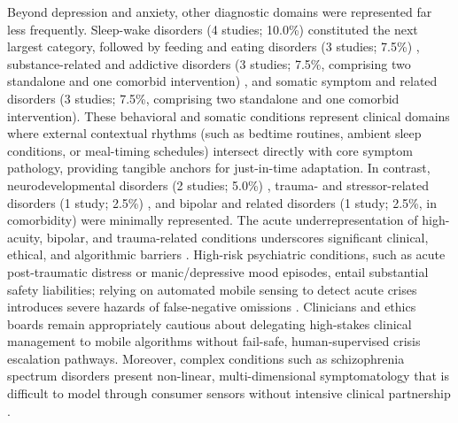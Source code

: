 Beyond depression and anxiety, other diagnostic domains were represented far less frequently. Sleep-wake disorders (4 studies; 10.0\%) \cite{werner-seidler2017sleepninja, pulantara2018insomnia, pulantara2018irest, philip2020kanopee} constituted the next largest category, followed by feeding and eating disorders (3 studies; 7.5\%) \cite{young2021myfoodmood, kasson2024teensengagement, sanchezroman2025eatingdisorders}, substance-related and addictive disorders (3 studies; 7.5\%, comprising two standalone and one comorbid intervention) \cite{adams2021mhealthapp, heinz2024opioidusedisorder}, and somatic symptom and related disorders (3 studies; 7.5\%, comprising two standalone and one comorbid intervention). These behavioral and somatic conditions represent clinical domains where external contextual rhythms (such as bedtime routines, ambient sleep conditions, or meal-timing schedules) intersect directly with core symptom pathology, providing tangible anchors for just-in-time adaptation. In contrast, neurodevelopmental disorders (2 studies; 5.0\%) \cite{yang2023appcbt, spaargaren2025sam}, trauma- and stressor-related disorders (1 study; 2.5\%) \cite{davis2024renewptsd}, and bipolar and related disorders (1 study; 2.5\%, in comorbidity) were minimally represented. The acute underrepresentation of high-acuity, bipolar, and trauma-related conditions underscores significant clinical, ethical, and algorithmic barriers \cite{martinezmartin2021ethical}. High-risk psychiatric conditions, such as acute post-traumatic distress or manic/depressive mood episodes, entail substantial safety liabilities; relying on automated mobile sensing to detect acute crises introduces severe hazards of false-negative omissions \cite{adler2024actionablesensing}. Clinicians and ethics boards remain appropriately cautious about delegating high-stakes clinical management to mobile algorithms without fail-safe, human-supervised crisis escalation pathways. Moreover, complex conditions such as schizophrenia spectrum disorders \cite{kidd2019app4independence, ben-zeev2021core, kidd2025appindependence} present non-linear, multi-dimensional symptomatology that is difficult to model through consumer sensors without intensive clinical partnership \cite{hassan2025utility}.

